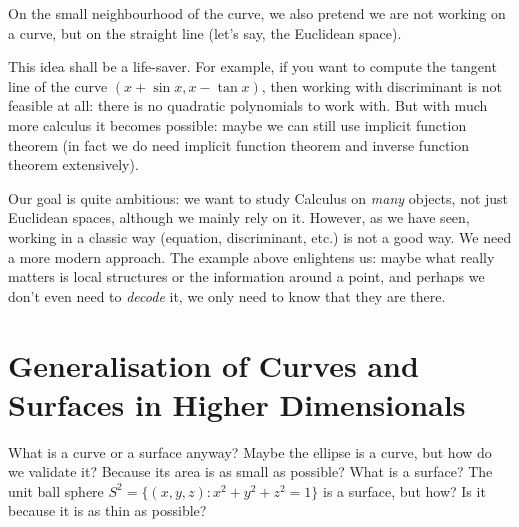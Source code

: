 \documentclass[twoside]{article}
\begin{document}
		On the small neighbourhood of the curve, we also pretend we are not working on a curve, but on the straight line (let's say, the Euclidean space).
		
		This idea shall be a life-saver. For example, if you want to compute the tangent line of the curve $(x+\sin{x},x-\tan{x})$, then working with discriminant is not feasible at all: there is no quadratic polynomials to work with. But with much more calculus it becomes possible: maybe we can still use implicit function theorem (in fact we do need implicit function theorem and inverse function theorem extensively). 
		
		Our goal is quite ambitious: we want to study Calculus on \textit{many} objects, not just Euclidean spaces, although we mainly rely on it. However, as we have seen, working in a classic way (equation, discriminant, etc.) is not a good way. We need a more modern approach. The example above enlightens us: maybe what really matters is local structures or the information around a point, and perhaps we don't even need to \textit{decode} it, we only need to know that they are there.
		
		\section{Generalisation of Curves and Surfaces in Higher Dimensionals}
		What is a curve or a surface anyway? Maybe the ellipse is a curve, but how do we validate it? Because its area is as small as possible? What is a surface? The unit ball sphere $S^2=\{(x,y,z):x^2+y^2+z^2=1\}$ is a surface, but how? Is it because it is as thin as possible?
		
\end{document}
